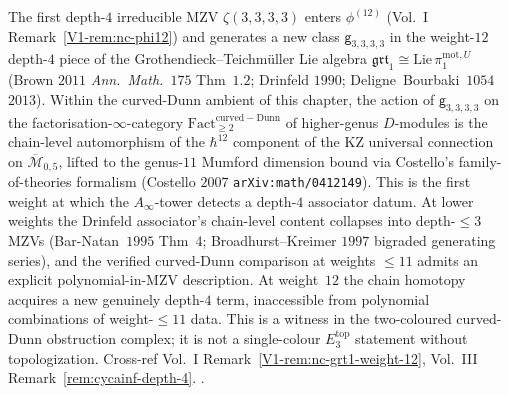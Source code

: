 \begin{remark}
\label{rem:cdhg-depth-4-grt1}
The first depth-$4$ irreducible MZV $\zeta(3, 3, 3, 3)$ enters
$\phi^{(12)}$ (Vol.~I Remark~\ref{V1-rem:nc-phi12}) and
generates a new class $\mathsf g_{3, 3, 3, 3}$ in the weight-$12$
depth-$4$ piece of the Grothendieck--Teichm\"uller Lie algebra
$\mathfrak{grt}_1\cong\mathrm{Lie}\,\pi_1^{\mathrm{mot}, U}$ (Brown
$2011$ \emph{Ann.\ Math.}~$175$ Thm~$1.2$; Drinfeld $1990$;
Deligne~Bourbaki~$1054$~$2013$). Within the curved-Dunn ambient of
this chapter, the action of $\mathsf g_{3, 3, 3, 3}$ on the
factorisation-$\infty$-category
$\mathrm{Fact}^{\mathrm{curved-Dunn}}_{\ge 2}$ of higher-genus
$D$-modules is the chain-level automorphism of the $\hbar^{12}$
component of the KZ universal connection on
$\overline{\mathcal M}_{0, 5}$, lifted to the genus-$11$ Mumford
dimension bound via Costello's family-of-theories formalism (Costello
$2007$ \texttt{arXiv:math/0412149}). This is the first weight at which
the $A_\infty$-tower detects a depth-$4$ associator datum. At lower
weights the Drinfeld associator's chain-level content collapses into
depth-$\le 3$ MZVs (Bar-Natan~$1995$ Thm~$4$; Broadhurst--Kreimer
$1997$ bigraded generating series), and the verified curved-Dunn
comparison at weights $\le 11$ admits an explicit polynomial-in-MZV
description. At weight~$12$ the chain
homotopy acquires a new genuinely depth-$4$ term, inaccessible from
polynomial combinations of weight-$\le 11$ data. This is a witness in
the two-coloured curved-Dunn obstruction complex; it is not a
single-colour $E_3^{\mathrm{top}}$ statement without topologization.
Cross-ref Vol.~I
Remark~\ref{V1-rem:nc-grt1-weight-12}, Vol.~III
Remark~\ref{rem:cycainf-depth-4}.
\cite{Brown2011,Brown2017,BroadhurstKreimer1997,Drinfeld1990,
 Deligne2013,BarNatan1995,Costello2007}.
\end{remark}

